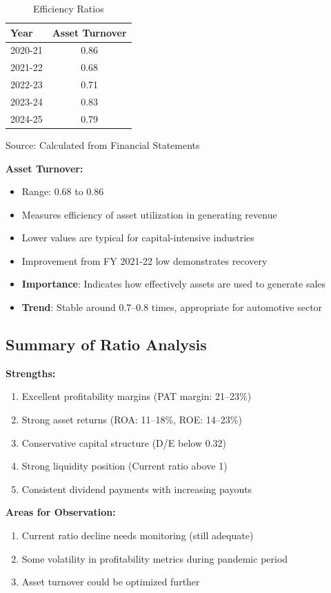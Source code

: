 \documentclass[8pt,a4paper]{article}
\begin{document}
\begin{table}[H]
\centering
\caption{Efficiency Ratios}
\label{tab:efficiency_ratios}
\begin{tabular}{lc}
\toprule
\textbf{Year} & \textbf{Asset Turnover} \\
\midrule
2020-21 & 0.86 \\
2021-22 & 0.68 \\
2022-23 & 0.71 \\
2023-24 & 0.83 \\
2024-25 & 0.79 \\
\bottomrule
\end{tabular}

\footnotesize
Source: Calculated from Financial Statements
\end{table}
\newpage
\textbf{Asset Turnover:}
\begin{itemize}
    \item Range: 0.68 to 0.86
    \item Measures efficiency of asset utilization in generating revenue
    \item Lower values are typical for capital-intensive industries
    \item Improvement from FY 2021-22 low demonstrates recovery
    \item \textbf{Importance}: Indicates how effectively assets are used to generate sales
    \item \textbf{Trend}: Stable around 0.7--0.8 times, appropriate for automotive sector
\end{itemize}

\subsection{Summary of Ratio Analysis}

\textbf{Strengths:}
\begin{enumerate}
    \item Excellent profitability margins (PAT margin: 21--23\%)
    \item Strong asset returns (ROA: 11--18\%, ROE: 14--23\%)
    \item Conservative capital structure (D/E below 0.32)
    \item Strong liquidity position (Current ratio above 1)
    \item Consistent dividend payments with increasing payouts
\end{enumerate}

\textbf{Areas for Observation:}
\begin{enumerate}
    \item Current ratio decline needs monitoring (still adequate)
    \item Some volatility in profitability metrics during pandemic period
    \item Asset turnover could be optimized further
\end{enumerate}
\end{document}
